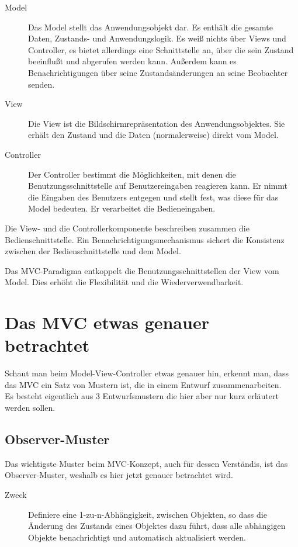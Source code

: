 \documentclass[11pt,a4paper,titlepage]{scrreprt}
\begin{document}
\begin{description}
\item[Model]
Das  Model stellt das Anwendungsobjekt dar. Es enthält die gesamte Daten, Zustands-
und Anwendungslogik. Es weiß nichts über Views und Controller, es bietet allerdings eine
Schnittstelle an, über die sein Zustand beeinflußt und abgerufen werden kann. Außerdem
kann es Benachrichtigungen über seine Zustandsänderungen an seine Beobachter senden.

\item[View]
Die View ist die Bildschirmrepräsentation des Anwendungsobjektes. Sie erhält den Zustand
und die Daten (normalerweise) direkt vom Model.

\item[Controller]
Der Controller bestimmt die Möglichkeiten, mit denen die Benutzungsschnittstelle auf
Benutzereingaben reagieren kann. Er nimmt die Eingaben des Benutzers entgegen und stellt
fest, was diese für das Model bedeuten. Er verarbeitet die Bedieneingaben.
\end{description}

Die View- und die Controllerkomponente beschreiben zusammen die Bedienschnittstelle.
Ein Benachrichtigungsmechanismus sichert die Konsistenz zwischen der Bedienschnittstelle
und dem Model.

Das MVC-Paradigma entkoppelt die Benutzungsschnittstellen der View vom Model. Dies
erhöht die Flexibilität und die Wiederverwendbarkeit.

\section{Das MVC etwas genauer betrachtet}
Schaut man beim Model-View-Controller etwas genauer hin, erkennt man, dass das MVC
ein Satz von Mustern ist, die in einem Entwurf zusammenarbeiten.\\
Es besteht eigentlich aus 3 Entwurfsmustern die hier aber nur kurz erläutert werden
sollen.

\subsection{Observer-Muster}
Das wichtigste Muster beim MVC-Konzept, auch für dessen Verständis, ist das Observer-Muster,
weshalb es hier jetzt genauer betrachtet wird.

\begin{description}
\item[Zweck]
Definiere eine 1-zu-n-Abhängigkeit, zwischen Objekten, so dass die Änderung des
Zustands eines Objektes dazu führt, dass alle abhängigen Objekte benachrichtigt
und automatisch aktualisiert werden. \citep[S. 287]{Riehle200407}
\end{description}
\end{document}
